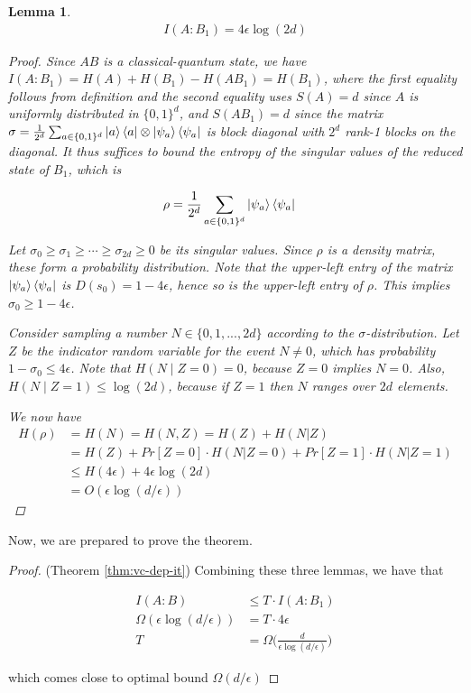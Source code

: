 \documentclass[12]{amsart}
\newcommand\0{\mathbf{0}}
\newcommand\<{\langle}
\renewcommand\>{\rangle}
\newtheorem{lemma}[theorem]{Lemma}
\begin{document}
\begin{lemma}
\begin{align*}
I(A:B_1) = 4 \epsilon \log(2d)
\end{align*}

\begin{proof}
Since $AB$ is a classical-quantum state, we have $I(A : B_1) = H(A) + H(B_1) − H(AB_1) = H(B_1)$,
where the first equality follows from definition and the second equality uses $S(A) = d$ since
$A$ is uniformly distributed in $\{0,1\}^d$, and $S(AB_1) = d$ since the matrix $\sigma = \frac{1}{2^d} \sum_{a \in \{0,1\}^d} \ket{a}\bra{a} \otimes \ket{\psi_a} \bra{\psi_a}$ is block diagonal with $2^d$ rank-1 blocks on the diagonal. It thus suffices to bound the entropy of the singular values of the reduced state of $B_1$, which is

\begin{align*}
\rho &= \frac{1}{2^d} \sum_{a \in \{0, 1\}^d} \ket{\psi_a} \bra{\psi_a}	
\end{align*}

Let $\sigma_0 \geq \sigma_1 \geq \cdots \geq \sigma_{2d} \geq 0$ be its singular values. Since $\rho$ is a density matrix, these form a probability distribution. Note that the upper-left entry of the matrix $\ket{\psi_a}\bra{\psi_a}$ is $D(s_0) = 1-4\epsilon$, hence so is the upper-left entry of $\rho$. This implies $\sigma_0 \geq 1 − 4\epsilon$. 

Consider sampling a number $N \in \{0,1,...,2d\}$ according to the $\sigma$-distribution. Let $Z$ be the indicator random variable for the event $N \neq 0$, which has probability $1 - \sigma_0 \leq 4 \epsilon$. Note that $H(N\mid Z=0)=0$, because $Z=0$ implies $N = 0$. Also, $H(N \mid Z = 1) \leq \log(2d)$, because if $Z = 1$ then $N$ ranges over $2d$ elements. 

We now have
\begin{align*}
H(\rho) &= H(N) = H(N,Z) = H(Z) + H(N | Z)\\
&= H(Z) + Pr[Z = 0] \cdot H(N | Z = 0) + Pr[Z = 1] \cdot H(N | Z = 1) \\
&\leq H(4\epsilon)+4\epsilon \log(2d)\\
&= O(\epsilon \log(d/\epsilon)) \tag{Using the Taylor series of the logarithm}
\end{align*}
\end{proof}
\end{lemma}

Now, we are prepared to prove the theorem.

\begin{proof}(Theorem \ref{thm:vc-dep-it})
Combining these three lemmas, we have that 

\begin{align*}
I(A:B) &\leq T \cdot I(A:B_1) \\
\Omega(\epsilon \log(d/\epsilon)) &= T \cdot 4 \epsilon \\
T &= \Omega \Big(\frac{d}{\epsilon \log(d/\epsilon)}\Big)
\end{align*}

which comes close to optimal bound $\Omega (d / \epsilon)$
\end{proof}
\end{document}
